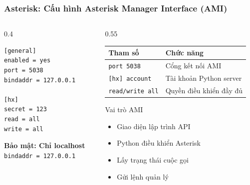 \begin{frame}[fragile]
\frametitle{Asterisk: Cấu hình Asterisk Manager Interface (AMI)}

\begin{columns}[t]
\begin{column}{0.4\textwidth}
\begin{verbatim}
[general]
enabled = yes
port = 5038
bindaddr = 127.0.0.1

[hx]
secret = 123
read = all
write = all
\end{verbatim}

\vspace{0.2cm}
\begin{alertblock}{}
\centering
\footnotesize
\textbf{Bảo mật: Chỉ localhost}\\
\texttt{bindaddr = 127.0.0.1}
\end{alertblock}
\end{column}

\begin{column}{0.55\textwidth}
\begin{table}[htbp]
\centering
\scriptsize
\begin{tabular}{|l|l|}
\hline
\textbf{Tham số} & \textbf{Chức năng} \\
\hline
\texttt{port 5038} & Cổng kết nối AMI \\
\hline
\texttt{[hx] account} & Tài khoản Python server \\
\hline
\texttt{read/write all} & Quyền điều khiển đầy đủ \\
\hline
\end{tabular}
\end{table}

\vspace{0.3cm}
\begin{exampleblock}{Vai trò AMI}
\begin{itemize}
\item Giao diện lập trình API
\item Python điều khiển Asterisk  
\item Lấy trạng thái cuộc gọi
\item Gửi lệnh quản lý
\end{itemize}
\end{exampleblock}
\end{column}
\end{columns}

\end{frame}
\fi

